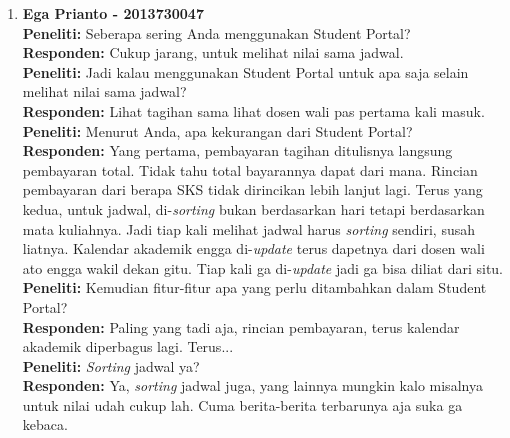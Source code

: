 \begin{enumerate}
	\item\textbf{Ega Prianto - 2013730047}\\
	\textbf{Peneliti:} Seberapa sering Anda menggunakan Student Portal?\\
	\textbf{Responden:} Cukup jarang, untuk melihat nilai sama jadwal.\\
	\textbf{Peneliti:} Jadi kalau menggunakan Student Portal untuk apa saja selain melihat nilai sama jadwal?\\
	\textbf{Responden:} Lihat tagihan sama lihat dosen wali pas pertama kali masuk.\\
	\textbf{Peneliti:} Menurut Anda, apa kekurangan dari Student Portal?\\
	\textbf{Responden:} Yang pertama, pembayaran tagihan ditulisnya langsung pembayaran total. Tidak tahu total bayarannya dapat dari mana. Rincian pembayaran dari berapa SKS tidak dirincikan lebih lanjut lagi. Terus yang kedua, untuk jadwal, di-\textit{sorting} bukan berdasarkan hari tetapi berdasarkan mata kuliahnya. Jadi tiap kali melihat jadwal harus \textit{sorting} sendiri, susah liatnya. Kalendar akademik engga di-\textit{update} terus dapetnya dari dosen wali ato engga wakil dekan gitu. Tiap kali ga di-\textit{update} jadi ga bisa diliat dari situ.\\
	\textbf{Peneliti:} Kemudian fitur-fitur apa yang perlu ditambahkan dalam Student Portal?\\
	\textbf{Responden:} Paling yang tadi aja, rincian pembayaran, terus kalendar akademik diperbagus lagi. Terus...\\
	\textbf{Peneliti:} \textit{Sorting} jadwal ya?\\
	\textbf{Responden:} Ya, \textit{sorting} jadwal juga, yang lainnya mungkin kalo misalnya untuk nilai udah cukup lah. Cuma berita-berita terbarunya aja suka ga kebaca.\\
\end{enumerate}

